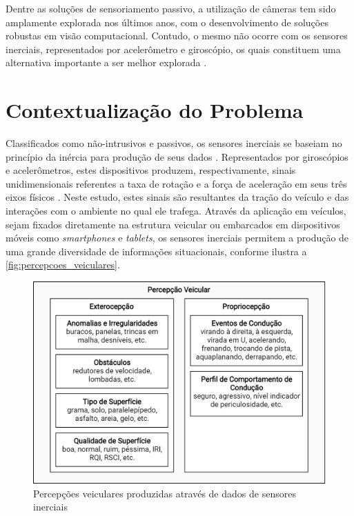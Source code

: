 Dentre as soluções de sensoriamento passivo, a utilização de câmeras tem sido amplamente explorada nos últimos anos, com o desenvolvimento de soluções robustas em visão computacional. Contudo, o mesmo não ocorre com os sensores inerciais, representados por acelerômetro e giroscópio, os quais constituem uma alternativa importante a ser melhor explorada \cite{menegazzo2018,menegazzo2020}.

\section{Contextualização do Problema}

Classificados como não-intrusivos e passivos, os sensores inerciais se baseiam no princípio da inércia para produção de seus dados \cite{Braga2017}. Representados por giroscópios e acelerômetros, estes dispositivos produzem, respectivamente, sinais unidimensionais referentes a taxa de rotação e a força de aceleração em seus três eixos físicos \cite{Groves2013}. Neste estudo, estes sinais são resultantes da tração do veículo e das interações com o ambiente no qual ele trafega. Através da aplicação em veículos, sejam fixados diretamente na estrutura veicular ou embarcados em dispositivos móveis como \textit{smartphones} e \textit{tablets}, os sensores inerciais permitem a produção de uma grande diversidade de informações situacionais, conforme ilustra a \autoref{fig:percepcoes_veiculares}.

\begin{figure}[h]
  \centering
  \caption{Percepções veiculares produzidas através de dados de sensores inerciais}
  \label{fig:percepcoes_veiculares}
  \includegraphics[width=0.9\linewidth]{figuras/fig_2.png}
\end{figure}

